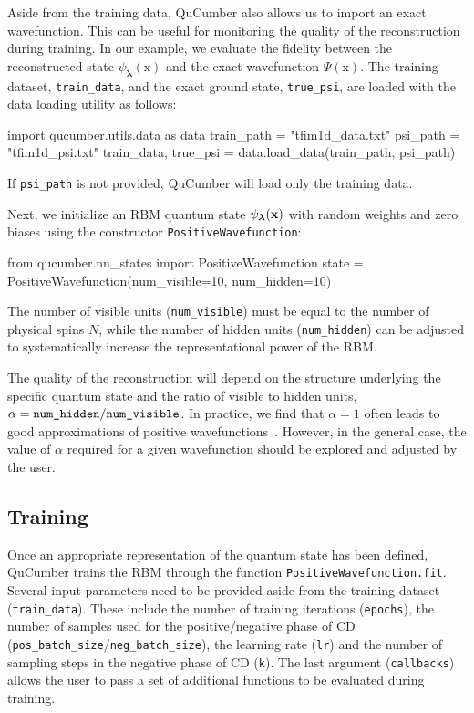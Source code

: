 \documentclass[submission, Phys, hidelnks]{SciPost}
\newcommand{\x}{\bm{\mathrm{x}}}
\begin{document}
Aside from the training data, QuCumber also allows us to import an exact
wavefunction. This can be useful for monitoring the quality of the
reconstruction during training. In our example, we evaluate the fidelity between
the reconstructed state $\psi_{\bm{\lambda}}(\x)$ and the exact wavefunction
$\Psi(\x)$. The training dataset, \verb|train_data|, and the exact ground
state, \verb|true_psi|, are loaded with the data loading utility as follows:
\begin{python}
import qucumber.utils.data as data
train_path = "tfim1d_data.txt"
psi_path = "tfim1d_psi.txt"
train_data, true_psi = data.load_data(train_path, psi_path)
\end{python}
If \verb|psi_path| is not provided, QuCumber will load only the training data.

Next, we initialize an RBM quantum state $\psi_{\bm{\lambda}}(\bf{x})$ with
random weights and zero biases using the constructor \verb|PositiveWavefunction|:
\begin{python}
from qucumber.nn_states import PositiveWavefunction
state = PositiveWavefunction(num_visible=10, num_hidden=10)
\end{python}
The number of visible units (\verb|num_visible|) must be equal to the number
of physical spins $N$, while the number of hidden units (\verb|num_hidden|) can
 be adjusted to systematically increase the representational power of the RBM.\@

The quality of the reconstruction will depend on the structure underlying the
specific quantum state and the ratio of visible to hidden units,
$\alpha = \verb|num_hidden|/\verb|num_visible|$.
In practice, we find that $\alpha = 1$ often leads to good
approximations of positive wavefunctions~\cite{torlai_neural-network_2018}.
However, in the general case, the value of $\alpha$ required for a given
wavefunction should be explored and adjusted by the user.


\subsection{Training}
Once an appropriate representation of the quantum state has been defined,
QuCumber trains the RBM through the function \verb|PositiveWavefunction.fit|.
Several input parameters need to be provided aside from the training dataset
(\verb|train_data|). These include the number of training iterations
(\verb|epochs|), the number of samples used for the positive/negative phase of
CD (\verb|pos_batch_size|/\verb|neg_batch_size|), the learning rate (\verb|lr|)
and the number of sampling steps in the negative phase of CD (\verb|k|). The
last argument (\verb|callbacks|) allows the user to pass a set of additional
functions to be evaluated during training.
\end{document}
